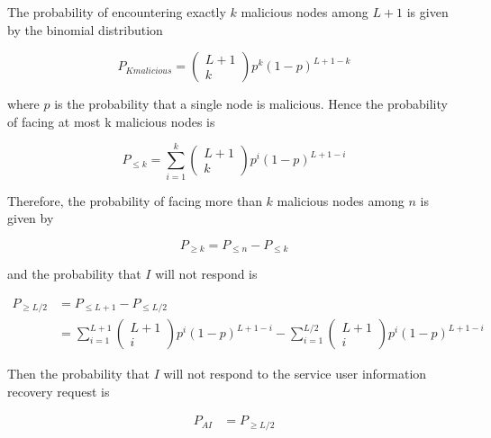The probability of encountering exactly $k$ malicious nodes among $L +1$ is given by the binomial
distribution

    \begin{equation}
      P_{K malicious} = \begin{pmatrix} L+1 \\ k\end{pmatrix} p^k (1-p)^{L+1-k}
    \end{equation}

    where $p$ is the probability that a single node is malicious. Hence the
probability of facing at most k malicious nodes is 

    \begin{equation}
      P_{\leq k} = \sum_{i=1}^{k} \begin{pmatrix} L+1 \\ k\end{pmatrix} p^i (1-p)^{L+1-i}
    \end{equation}

    Therefore, the probability of facing more than $k$ malicious nodes among
$n$ is given by

    \begin{equation}
      P_{\ge k} = P_{\leq n} - P_{\leq k}
    \end{equation}

    and the probability that $I$ will not respond is

    \begin{align}
      P_{\ge L/2} &= P_{\leq L+1} - P_{\leq L/2} \\
      &= \sum_{i=1}^{L+1} \begin{pmatrix} L+1 \\ i\end{pmatrix} p^i (1-p)^{L+1-i}
      - \sum_{i=1}^{L/2} \begin{pmatrix} L+1 \\ i\end{pmatrix} p^i (1-p)^{L+1-i}
    \end{align}


    Then the probability that $I$ will not respond to the service user
information recovery request is

    \begin{align}
      P_{AI} &= P_{\ge L/2} \\
    \end{align}


